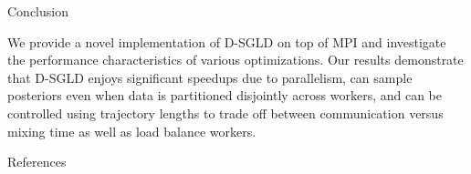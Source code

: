 \documentclass[final]{beamer}
\newlength{\onecolwid}
\begin{document}
\begin{frame}[t]
\begin{columns}[t]
\begin{column}{\onecolwid}

\begin{block}{Conclusion}

  We provide a novel implementation of D-SGLD on top of MPI and investigate the performance
  characteristics of various optimizations. Our results demonstrate that D-SGLD enjoys
  significant speedups due to parallelism, can sample posteriors even when data is partitioned
  disjointly across workers, and can be controlled using trajectory lengths to trade off
  between communication versus mixing time as well as load balance workers.
\end{block}






\begin{block}{References}

\nocite{*} %
\small{
\vspace{0.75in}}

\end{block}



\end{column}
\end{columns}
\end{frame}
\end{document}
